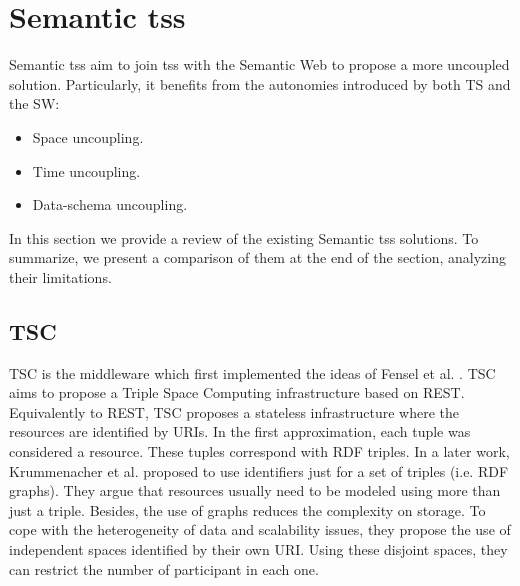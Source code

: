 \section{Semantic \aclp{ts}}
\label{sec:tsc_soa}


Semantic \aclp{ts} aim to join \aclp{ts} with the Semantic Web to propose a more uncoupled solution.
Particularly, it benefits from the autonomies introduced by both TS and the SW:

\begin{itemize}
  \item Space uncoupling.
  \item Time uncoupling.
  \item Data-schema uncoupling. %
\end{itemize}


In this section we provide a review of the existing Semantic \aclp{ts} solutions. %
To summarize, we present a comparison of them at the end of the section, analyzing their limitations.




\subsection{TSC}
TSC \citep{fensel_tsc_2007} is the middleware which first implemented the ideas of Fensel et al. \citep{fensel_triple-space_2004}.
TSC aims to propose a Triple Space Computing infrastructure based on REST.
Equivalently to REST, TSC proposes a stateless infrastructure where the resources are identified by URIs.
In the first approximation, each tuple was considered a resource.
These tuples correspond with RDF triples.
In a later work,  Krummenacher et al. \citep{krummenacher2006specification} proposed to use identifiers just for a set of triples (i.e. RDF graphs).
They argue that resources usually need to be modeled using more than just a triple.
Besides, the use of graphs reduces the complexity on storage.
To cope with the heterogeneity of data and scalability issues, they propose the use of independent spaces identified by their own URI.
Using these disjoint spaces, they can restrict the number of participant in each one.


